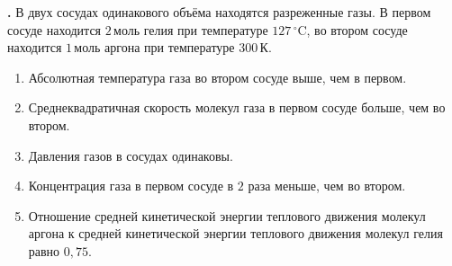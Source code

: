 \documentclass[12pt,a4paper]{article}
\newif\ifShowSolutions
\newcounter{banktask}
\newcommand{\BankTask}[3]{%
  \refstepcounter{banktask}%
  \Needspace{35mm}\par\medskip\noindent\begin{minipage}{\linewidth}%
  \noindent\textbf{\thebanktask.}\quad #2\par
  \ifShowSolutions
    #3\par
    \ifdefined\TutorEdition
      \ifcsname TutorSource#1\endcsname
        \smallskip{\small\csname TutorSource#1\endcsname\par}%
      \fi
    \fi
  \fi
  \end{minipage}\par\medskip
}
\begin{document}
\BankTask{403D76}{
В двух сосудах одинакового объёма находятся разреженные газы.
В первом сосуде находится \(2\,\text{моль}\) гелия при температуре \(127\,^{\circ}\mathrm{C}\), во втором сосуде находится \(1\,\text{моль}\) аргона при температуре \(300\,\text{К}\).
\begin{enumerate}
\item Абсолютная температура газа во втором сосуде выше, чем в первом.
\item Среднеквадратичная скорость молекул газа в первом сосуде больше, чем во втором.
\item Давления газов в сосудах одинаковы.
\item Концентрация газа в первом сосуде в \(2\) раза меньше, чем во втором.
\item Отношение средней кинетической энергии теплового движения молекул аргона к средней кинетической энергии теплового движения молекул гелия равно \(0{,}75\).
\end{enumerate}
}{
\smallskip\noindent\textbf{Решение от GPT}\par
\(T_1=127+273=400\,\text{К}\), \(T_2=300\,\text{К}\).
\begin{enumerate}
\item Неверно: \(T_2<T_1\).
\item Верно: \(v_{\text{кв}}=\sqrt{3RT/M}\); у гелия температура выше, а молярная масса меньше, поэтому \(v_{\text{кв},1}>v_{\text{кв},2}\).
\item Неверно: \(p_1/p_2=\nu_1T_1/(\nu_2T_2)=8/3\).
\item Неверно: при одинаковых объёмах \(n_1/n_2=\nu_1/\nu_2=2\), то есть концентрация в первом сосуде больше.
\item Верно: \(\overline E=3kT/2\), поэтому \(\overline E_{\mathrm{Ar}}/\overline E_{\mathrm{He}}=300/400=0{,}75\).
\end{enumerate}
Ответ: \(25\).
}
\end{document}
